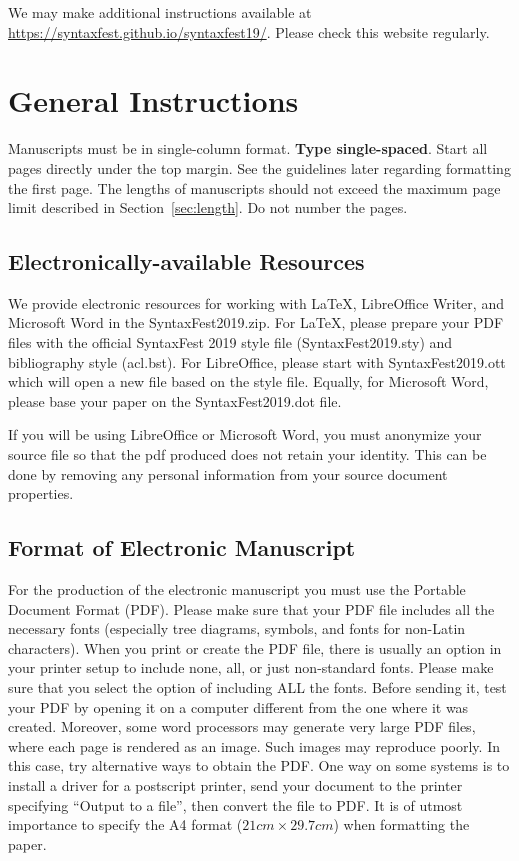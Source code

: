 \documentclass[11pt]{article}
\begin{document}
We may make additional instructions available at \url{https://syntaxfest.github.io/syntaxfest19/}. Please check this website regularly.



\section{General Instructions}

Manuscripts must be in single-column format. \textbf{Type single-spaced}. Start all pages directly under the top margin. See the guidelines later regarding formatting the first page. The lengths of manuscripts should not exceed the maximum page limit described in Section~\ref{sec:length}.
Do not number the pages.


\subsection{Electronically-available Resources}

We provide electronic resources for working with LaTeX, LibreOffice Writer, and Microsoft Word in the SyntaxFest2019.zip. For LaTeX, please prepare your PDF files with the official SyntaxFest 2019 style file (SyntaxFest2019.sty) and bibliography style (acl.bst). For LibreOffice, please start with SyntaxFest2019.ott which will open a new file based on the style file. Equally, for Microsoft Word, please base your paper on the SyntaxFest2019.dot file.

If you will be using LibreOffice or Microsoft Word, you must anonymize your source file so that the pdf produced does not retain your identity. This can be done by removing any personal information from your source document properties.


\subsection{Format of Electronic Manuscript}
\label{sect:pdf}

For the production of the electronic manuscript you must use the Portable Document Format (PDF). Please make sure that your PDF file includes all the necessary fonts (especially tree diagrams, symbols, and fonts for non-Latin characters). When you print or create the PDF file, there is usually an option in your printer setup to include none, all, or just non-standard fonts. Please make sure that you select the option of including ALL the fonts. Before sending it, test your PDF by opening it on a computer different from the one where it was created. Moreover, some word processors may generate very large PDF files, where each page is rendered as an image. Such images may reproduce poorly. In this case, try alternative ways to obtain the PDF. One way on some systems is to install a driver for a postscript printer, send your document to the printer specifying ``Output to a file'', then convert the file to PDF. It is of utmost importance to specify the A4 format ($ 21 cm \times 29.7 cm $) when formatting the paper. 
\end{document}
